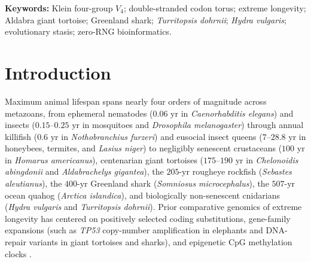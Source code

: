 \documentclass[11pt,a4paper]{article}
\renewcommand{\_}{\origunderscore\penalty200\relax}
\theoremstyle{remark}
\begin{document}
\noindent\textbf{Keywords:} Klein four-group $V_4$; double-stranded codon torus; extreme longevity; Aldabra giant tortoise; Greenland shark; \textit{Turritopsis dohrnii}; \textit{Hydra vulgaris}; evolutionary stasis; zero-RNG bioinformatics.

\section{Introduction}
Maximum animal lifespan spans nearly four orders of magnitude across metazoans, from ephemeral nematodes ($0.06\text{ yr}$ in \textit{Caenorhabditis elegans}) and insects ($0.15\text{--}0.25\text{ yr}$ in mosquitoes and \textit{Drosophila melanogaster}) through annual killifish ($0.6\text{ yr}$ in \textit{Nothobranchius furzeri}) and eusocial insect queens ($7\text{--}28.8\text{ yr}$ in honeybees, termites, and \textit{Lasius niger}) to negligibly senescent crustaceans ($100\text{ yr}$ in \textit{Homarus americanus}), centenarian giant tortoises ($175\text{--}190\text{ yr}$ in \textit{Chelonoidis abingdonii} and \textit{Aldabrachelys gigantea}), the $205\text{-yr}$ rougheye rockfish (\textit{Sebastes aleutianus}), the $400\text{-yr}$ Greenland shark (\textit{Somniosus microcephalus}), the $507\text{-yr}$ ocean quahog (\textit{Arctica islandica}), and biologically non-senescent cnidarians (\textit{Hydra vulgaris} and \textit{Turritopsis dohrnii}).
Prior comparative genomics of extreme longevity has centered on positively selected coding substitutions, gene-family expansions (such as \textit{TP53} copy-number amplification in elephants and DNA-repair variants in giant tortoises and sharks), and epigenetic CpG methylation clocks \cite{Quesada2019,Cilingir2022,Kolora2021,PascualTorner2022}.
\end{document}

